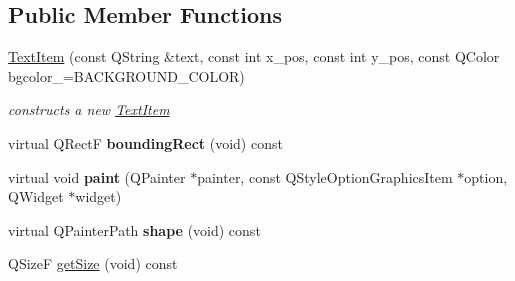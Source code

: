 \subsection*{Public Member Functions}
\begin{DoxyCompactItemize}
\item 
\hyperlink{class_text_item_a6e8b0642b2f4d3f6604728916d00162f}{Text\+Item} (const Q\+String \&text, const int x\+\_\+pos, const int y\+\_\+pos, const Q\+Color bgcolor\+\_\+=B\+A\+C\+K\+G\+R\+O\+U\+N\+D\+\_\+\+C\+O\+L\+OR)\hypertarget{class_text_item_a6e8b0642b2f4d3f6604728916d00162f}{}\label{class_text_item_a6e8b0642b2f4d3f6604728916d00162f}

\begin{DoxyCompactList}\small\item\em constructs a new \hyperlink{class_text_item}{Text\+Item} \end{DoxyCompactList}\item 
virtual Q\+RectF {\bfseries bounding\+Rect} (void) const \hypertarget{class_text_item_a831152f70253ef126712c361cefa01a8}{}\label{class_text_item_a831152f70253ef126712c361cefa01a8}

\item 
virtual void {\bfseries paint} (Q\+Painter $\ast$painter, const Q\+Style\+Option\+Graphics\+Item $\ast$option, Q\+Widget $\ast$widget)\hypertarget{class_text_item_ad453e5bac5a30a89a7c72987b90a1851}{}\label{class_text_item_ad453e5bac5a30a89a7c72987b90a1851}

\item 
virtual Q\+Painter\+Path {\bfseries shape} (void) const \hypertarget{class_text_item_a1b1dca54025a2d9550516f4fd28d4817}{}\label{class_text_item_a1b1dca54025a2d9550516f4fd28d4817}

\item 
Q\+SizeF \hyperlink{class_text_item_a4b0b6f4315c82096ea88690b6936ddb7}{get\+Size} (void) const \hypertarget{class_text_item_a4b0b6f4315c82096ea88690b6936ddb7}{}\label{class_text_item_a4b0b6f4315c82096ea88690b6936ddb7}


\end{DoxyCompactItemize}
